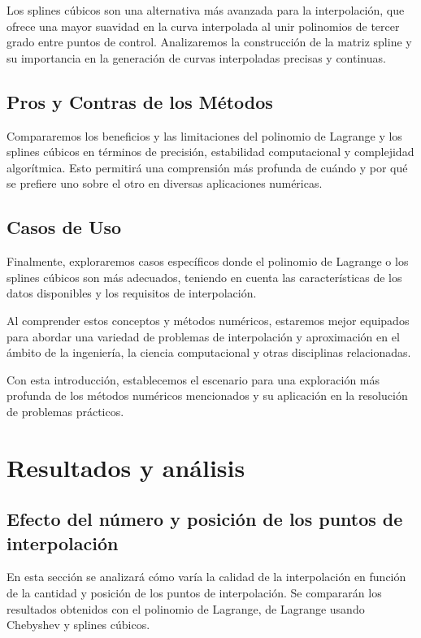 \documentclass[12pt,a4]{article} %
\begin{document}
\begin{multicols}{2}
Los splines cúbicos son una alternativa más avanzada para la interpolación, que ofrece una mayor suavidad en la curva interpolada al unir polinomios de tercer grado entre puntos de control. Analizaremos la construcción de la matriz spline y su importancia en la generación de curvas interpoladas precisas y continuas.

\subsection{Pros y Contras de los Métodos}

Compararemos los beneficios y las limitaciones del polinomio de Lagrange y los splines cúbicos en términos de precisión, estabilidad computacional y complejidad algorítmica. Esto permitirá una comprensión más profunda de cuándo y por qué se prefiere uno sobre el otro en diversas aplicaciones numéricas.

\subsection{Casos de Uso}

Finalmente, exploraremos casos específicos donde el polinomio de Lagrange o los splines cúbicos son más adecuados, teniendo en cuenta las características de los datos disponibles y los requisitos de interpolación.

Al comprender estos conceptos y métodos numéricos, estaremos mejor equipados para abordar una variedad de problemas de interpolación y aproximación en el ámbito de la ingeniería, la ciencia computacional y otras disciplinas relacionadas.

Con esta introducción, establecemos el escenario para una exploración más profunda de los métodos numéricos mencionados y su aplicación en la resolución de problemas prácticos.

\section{Resultados y análisis}

\subsection{Efecto del número y posición de los puntos de interpolación}

En esta sección se analizará cómo varía la calidad de la interpolación en función de la cantidad y posición de los puntos de interpolación. Se compararán los resultados obtenidos con el polinomio de Lagrange, de Lagrange usando Chebyshev y splines cúbicos.


\end{multicols}
\end{document}
